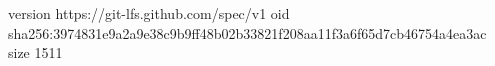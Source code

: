 version https://git-lfs.github.com/spec/v1
oid sha256:3974831e9a2a9e38c9b9ff48b02b33821f208aa11f3a6f65d7cb46754a4ea3ac
size 1511
